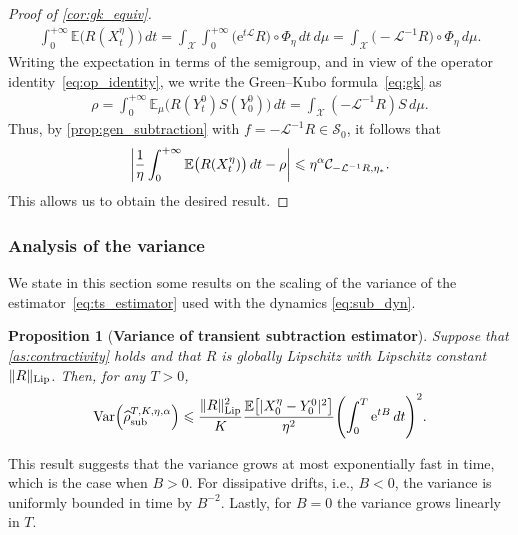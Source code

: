 \documentclass[11pt]{article}
\newcommand{\E}{\mathbb{E}}
\newcommand{\e}{\mathrm{e}}
\renewcommand{\L}{\mathcal{L}}
\renewcommand{\S}{\mathscr{S}}
\renewcommand{\leq}{\leqslant}
\DeclareMathOperator{\Var}{Var}
\DeclarePairedDelimiter\abs{\lvert}{\rvert}
\DeclarePairedDelimiter\paren{\lparen}{\rparen}
\DeclarePairedDelimiter\bkt{\lbrack}{\rbrack}
\newtheorem{proposition}{Proposition}
\theoremstyle{definition}
\newcommand{\RLip}{\|R\|_{\rm Lip}}
\newcommand{\estTmp}{\widehat{\rho}}
\newcommand{\aTSest}{\estTmp^{T,K,\eta,\alpha}_{\rm sub}} %
\begin{document}
\begin{proof}[Proof of \cref{cor:gk_equiv}]
\begin{align}
		\int_0^{+\infty} \E\bigl(R(X^\eta_t)\bigr) \, dt = \int_\mathcal{X}\int_0^{+\infty} \bigl(\e^{t\L}R\bigr)\circ \Phi_\eta \, dt \, d\mu
= \int_\mathcal{X} \bigl(-\L^{-1}R\bigr)\circ \Phi_\eta \, d\mu.
		\label{eq:cor_Tint_to_LinvR}
	\end{align}
Writing the expectation in terms of the semigroup, and in view of the operator identity~\eqref{eq:op_identity}, we write the Green--Kubo formula~\eqref{eq:gk} as
\begin{align}
		\rho = \int_0^{+\infty} \E_\mu\bigl(R(Y_t^0)S(Y_0^0)\bigr) \, dt = \int_\mathcal{X} (-\L^{-1}R)S \, d\mu.
	\end{align}
Thus, by \cref{prop:gen_subtraction} with $f = -\L^{-1}R \in \S_0$, it follows that
\begin{equation}
		\abs*{\frac{1}{\eta}\int_0^{+\infty} \E\bigl(R(X^\eta_t)\bigr) \, dt - \rho} \leq \eta^{\alpha} \mathcal{C}_{-\L^{-1}R,\eta_*}.
		\label{eq:cor_eta_bias}
	\end{equation}
This allows us to obtain the desired result.
\end{proof}

\subsubsection{Analysis of the variance}
\label{subsubsec:variance_analysis}
We state in this section some results on the scaling of the variance of the estimator~\eqref{eq:ts_estimator} used with the dynamics \eqref{eq:sub_dyn}.

\begin{proposition}[{\bf Variance of transient subtraction estimator}]
	\label{prop:var_ts}
	Suppose that \cref{as:contractivity} holds and that $R$ is globally Lipschitz with Lipschitz constant $\RLip$. Then, for any $T>0$,
\begin{equation}
		\Var\paren*{\aTSest} \leq \frac{\RLip^2}{K}\frac{\E\bkt*{|X_0^\eta - Y_0^0|^2}}{\eta^2}\paren*{\int_0^T \e^{tB} \, dt}^2.
\label{eq:var_prop_bound}
	\end{equation}
\end{proposition}
This result suggests that the variance grows at most exponentially fast in time, which is the case when $B>0$. For dissipative drifts, i.e., $B<0$, the variance is uniformly bounded in time by $B^{-2}$. Lastly, for $B=0$ the variance grows linearly in $T$.
\end{document}
